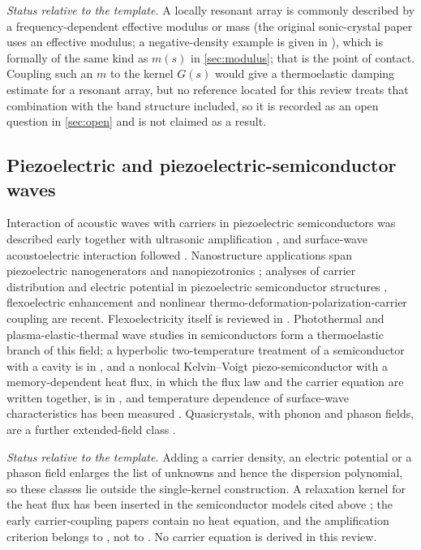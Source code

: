 \emph{Status relative to the template.} A locally resonant array is commonly described by a frequency-dependent effective modulus or mass (the original sonic-crystal paper \cite{Liu2000} uses an effective modulus; a negative-density example is given in \cite{Oh2016}), which is formally of the same kind as $m(s)$ in \cref{sec:modulus}; that is the point of contact. Coupling such an $m$ to the kernel $G(s)$ would give a thermoelastic damping estimate for a resonant array, but no reference located for this review treats that combination with the band structure included, so it is recorded as an open question in \cref{sec:open} and is not claimed as a result.

\subsection{Piezoelectric and piezoelectric-semiconductor waves}
Interaction of acoustic waves with carriers in piezoelectric semiconductors was described early \cite{Hutson1962} together with ultrasonic amplification \cite{White1962}, and surface-wave acoustoelectric interaction followed \cite{Palma1987}. Nanostructure applications span piezoelectric nanogenerators \cite{Wang2006Nano} and nanopiezotronics \cite{Wang2007Nano}; analyses of carrier distribution and electric potential in piezoelectric semiconductor structures \cite{Dai2018}, flexoelectric enhancement \cite{Zhao2022} and nonlinear thermo-deformation-polarization-carrier coupling \cite{Xiao2025} are recent. Flexoelectricity itself is reviewed in \cite{Cross2006,Zubko2013}. Photothermal and plasma-elastic-thermal wave studies in semiconductors \cite{Abbas2018,Khamis2020,Mahdy2020} form a thermoelastic branch of this field; a hyperbolic two-temperature treatment of a semiconductor with a cavity is in \cite{Hobiny2022}, and a nonlocal Kelvin--Voigt piezo-semiconductor with a memory-dependent heat flux, in which the flux law and the carrier equation are written together, is in \cite{Gupta2026HeatMap}, and temperature dependence of surface-wave characteristics has been measured \cite{Nishimura2005}. Quasicrystals, with phonon and phason fields, are a further extended-field class \cite{Shechtman1984,Levine1984,Chellappan2015,LiZhou2023}.

\emph{Status relative to the template.} Adding a carrier density, an electric potential or a phason field enlarges the list of unknowns and hence the dispersion polynomial, so these classes lie outside the single-kernel construction. A relaxation kernel for the heat flux has been inserted in the semiconductor models cited above \cite{Hobiny2022,Gupta2026HeatMap}; the early carrier-coupling papers \cite{Hutson1962,White1962} contain no heat equation, and the amplification criterion belongs to \cite{White1962}, not to \cite{Hutson1962}. No carrier equation is derived in this review.

